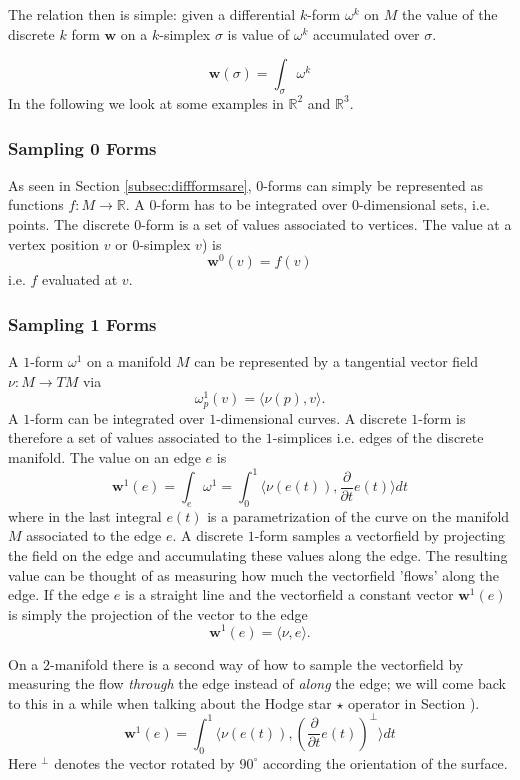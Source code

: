 The relation then is simple: given a differential $k$-form $\omega^k$ on $M$ the value of the discrete $k$ form $\textbf{w}$ on a $k$-simplex $\sigma$ is value of $\omega^k$ accumulated over $\sigma$.

 \[\textbf{w}(\sigma) = \int_\sigma \omega^k\]
In the following we look at some examples in $\mathbb R^2$ and $\mathbb R^3$.

\subsubsection{Sampling 0 Forms}

As seen in Section \ref{subsec:diffformsare}, $0$-forms can simply be represented as functions $f: M\to \mathbb R$. A $0$-form has to be integrated over 0-dimensional sets, i.e. points. The discrete 0-form is a set of values associated to vertices. The value at a vertex position $v$ or 0-simplex $v$) is
\[\textbf{w}^0(v) = f(v)\]
i.e. $f$ evaluated at $v$.

\subsubsection{Sampling 1 Forms}
A $1$-form $\omega^1$ on a manifold $M$ can be represented by a tangential vector field $\nu:M\to TM$ via 
\[\omega^1_p(v) = \langle\nu(p),v\rangle.\] 
A $1$-form can be integrated over $1$-dimensional curves. A discrete $1$-form is therefore a set of values associated to the $1$-simplices i.e. edges of the discrete manifold. The value on an edge $e$ is
\[\textbf{w}^1(e) = \int_{e} \omega^1 = \int_{0}^1 \langle\nu(e(t)),\frac{\partial}{\partial t}e(t)\rangle dt\]
where in the last integral $e(t)$ is a parametrization of the curve on the manifold $M$ associated to the edge $e$. A discrete $1$-form samples a vectorfield by projecting the field on the edge and accumulating these values along the edge. The resulting value can be thought of as measuring how much the vectorfield 'flows' along the edge. If the edge $e$ is a straight line and the vectorfield a constant vector  $\textbf{w}^1(e)$ is simply the projection of the vector to the edge
\[\textbf{w}^1(e) = \langle \nu, e \rangle.\]

On a $2$-manifold there is a second way of how to sample the vectorfield by measuring the flow \emph{through} the edge instead of \emph{along} the edge; we will come back to this in a while when talking about the Hodge star $\star$ operator in Section \note{[...]}). 
\[\textbf{w}^1(e) = \int_{0}^1 \langle\nu(e(t)),(\frac{\partial}{\partial t}e(t))^\perp \rangle dt\]
Here $^\perp$ denotes the vector rotated by $90^\circ$ according the orientation of the surface.

